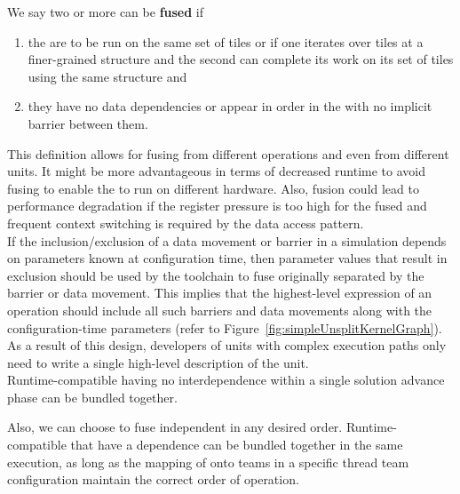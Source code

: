 \documentclass{article}
\begin{document}
We say two or more \taskroutines can be
\textbf{fused} if
\begin{enumerate}
\item{the \taskroutines are to be run on the same set of tiles or if one \taskroutine
iterates over tiles at a finer-grained structure and the second \taskroutine can
complete its work on its set of tiles using the same structure and}
\item{they have no data dependencies or appear in order in the \AKG with
no implicit barrier between them.}
\end{enumerate}
This definition allows for fusing \taskroutines from different operations and even from
different units.
It might be more advantageous in terms of decreased runtime
to avoid fusing to enable the \taskroutines to run on different hardware.  Also,
fusion could lead to performance degradation if the register pressure is too
high for the fused \taskroutine and frequent context switching is required by the data
access pattern.\\

If the inclusion/exclusion of a data movement or barrier in a simulation depends
on parameters known at configuration time, then parameter values that result in
exclusion should be used by the toolchain to fuse \taskroutines originally separated by
the barrier or data movement.  This implies that the highest-level expression of
an operation should include all such barriers and data movements along with the configuration-time parameters (refer to
Figure~\ref{fig:simpleUnsplitKernelGraph}).  As a result of this design, developers of
units with complex execution paths only need to write a single high-level
description of the unit.\\

Runtime-compatible \taskroutines having no interdependence within a single
solution advance phase can be bundled together.

Also, we can choose to fuse independent \taskroutines in any
desired order.  Runtime-compatible \taskroutines that have a dependence can be bundled
together in the same \OR execution, as long as the mapping of \taskroutines onto
teams in a specific thread team configuration maintain the correct order of
operation.\\
\end{document}
